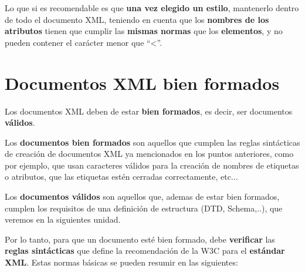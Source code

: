 Lo que si es recomendable es que \textbf{una vez elegido un estilo}, mantenerlo dentro de todo el documento XML, teniendo en cuenta que los \textbf{nombres de los atributos} tienen que cumplir las \textbf{mismas normas} que los \textbf{elementos}, y no pueden contener el carácter menor que ``<''.

\section{Documentos XML bien formados}
Los documentos XML deben de estar \textbf{bien formados}, es decir, ser documentos \textbf{válidos}.

Los \textbf{documentos bien formados} son aquellos que cumplen las reglas sintácticas de creación de documentos XML ya mencionados en los puntos anteriores, como por ejemplo, que usan caracteres válidos para la creación de nombres de etiquetas o atributos, que las etiquetas estén cerradas correctamente, etc...

Los \textbf{documentos válidos} son aquellos que, ademas de estar bien formados, cumplen los requisitos de una definición de estructura (DTD, Schema,..), que veremos en la siguientes unidad.

Por lo tanto, para que un documento esté bien formado, debe \textbf{verificar} las \textbf{reglas sintácticas} que define la recomendación de la W3C para el \textbf{estándar XML}. Estas normas básicas se pueden resumir en las siguientes:

